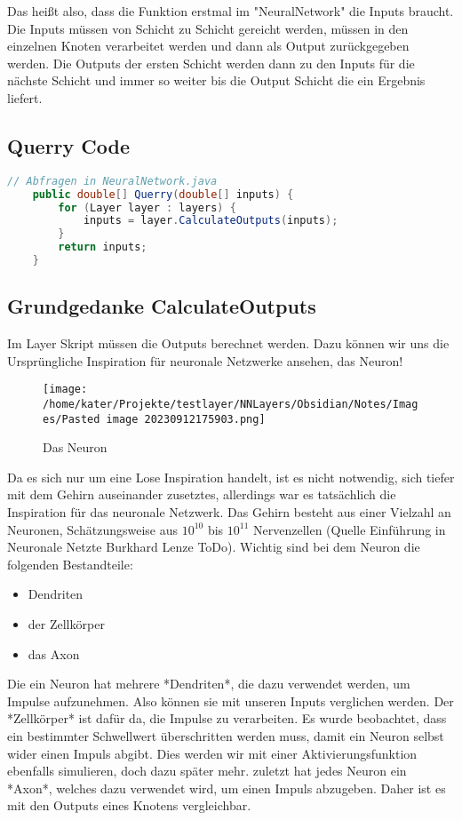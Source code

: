 \documentclass[12pt]{article}
\begin{document}
Das heißt also, dass die Funktion erstmal im "NeuralNetwork" die Inputs braucht. Die Inputs müssen von Schicht zu Schicht gereicht werden, müssen in den einzelnen Knoten verarbeitet werden und dann als Output zurückgegeben werden. Die Outputs der ersten Schicht werden dann zu den Inputs für die nächste Schicht und immer so weiter bis die Output Schicht die ein Ergebnis liefert.\subsection{ Querry Code}\begin{lstlisting}[language=Java]
// Abfragen in NeuralNetwork.java
    public double[] Querry(double[] inputs) {
        for (Layer layer : layers) {
            inputs = layer.CalculateOutputs(inputs);
        }
        return inputs;
    }
\end{lstlisting}\subsection{ Grundgedanke CalculateOutputs}Im Layer Skript müssen die Outputs berechnet werden. Dazu können wir uns die Ursprüngliche Inspiration für neuronale Netzwerke ansehen, das Neuron!
\begin{figure}[H]
\centering
\texttt{[image: /home/kater/Projekte/testlayer/NNLayers/Obsidian/Notes/Images/Pasted image 20230912175903.png]}
\caption{Das Neuron}
\label{Was kommt hier rein?}
\end{figure}
Da es sich nur um eine Lose Inspiration handelt, ist es nicht notwendig, sich tiefer mit dem Gehirn auseinander zusetztes, allerdings war es tatsächlich die Inspiration für das neuronale Netzwerk. Das Gehirn besteht aus einer Vielzahl an Neuronen, Schätzungsweise aus $10^{10}$ bis $10^{11}$ Nervenzellen (Quelle Einführung in Neuronale Netzte Burkhard Lenze ToDo).
Wichtig sind bei dem Neuron die folgenden Bestandteile:
\begin{itemize}
  \item Dendriten
  \item der Zellkörper
  \item das Axon
\end{itemize}
  Die ein Neuron hat mehrere *Dendriten*, die dazu verwendet werden, um Impulse aufzunehmen. Also können sie mit unseren Inputs verglichen werden. Der *Zellkörper* ist dafür da, die Impulse zu verarbeiten. Es wurde beobachtet, dass ein bestimmter Schwellwert überschritten werden muss, damit ein Neuron selbst wider einen Impuls abgibt. Dies werden wir mit einer Aktivierungsfunktion ebenfalls simulieren, doch dazu später mehr. zuletzt hat jedes Neuron ein *Axon*, welches dazu verwendet wird, um einen Impuls abzugeben. Daher ist es mit den Outputs eines Knotens vergleichbar.
\end{document}
